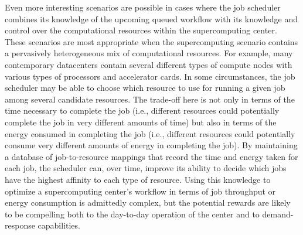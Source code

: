 Even more interesting scenarios are possible in cases where the job
scheduler combines its knowledge of the upcoming queued workflow with
its knowledge and control over the computational resources within
the supercomputing center.  These scenarios are most appropriate when
the supercomputing scenario contains a pervasively heterogeneous mix
of computational resources.  For example, many contemporary datacenters
contain several different types of compute nodes with various types of
processors and accelerator cards.  In some circumstances, the job
scheduler may be able to choose which resource to use for running a
given job among several candidate resources.  The trade-off here is
not only in terms of the time necessary to complete the job (i.e.,
different resources could potentially complete the job in very different
amounts of time) but also in terms of the energy consumed in completing
the job (i.e., different resources could potentially consume very
different amounts of energy in completing the job).  By maintaining a
database of job-to-resource mappings that record the time and energy
taken for each job, the scheduler can, over time, improve its ability
to decide which jobs have the highest affinity to each type of resource.
Using this knowledge to optimize a supercomputing center's workflow in
terms of job throughput or energy consumption is admittedly complex,
but the potential rewards are likely to be compelling both to the
day-to-day operation of the center and to demand-response capabilities.


